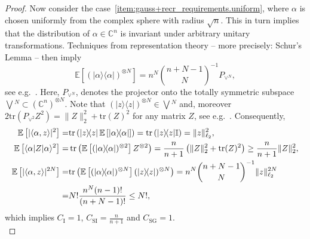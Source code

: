 \begin{proof}
  Now consider the case~\ref{item:gauss+recr_requirements.uniform}, where $\alpha$ is chosen uniformly from the complex sphere with radius $\sqrt{n}$.
  This in turn implies that the distribution of $\alpha \in \mathbb{C}^n$ is invariant under arbitrary unitary transformations.
  Techniques from representation theory -- more precisely: Schur's Lemma -- then imply
  \[
    \label{eq:pl.from_schur}
    \mathbb{E} \left[ (|\alpha \rangle \! \langle \alpha| )^{\otimes N} \right] =
    n^N \binom{n+N-1}{N}^{-1}  P_{\vee^N},
  \]
  see e.g.\ \cite[Lemma~1]{Scott_2006_Tight}.
  Here, $ P_{\vee^N}$, denotes the projector onto the totally symmetric subspace $\bigvee\!^N \subset \left( \mathbb{C}^n \right)^{\otimes N}$.
  Note that $\left(| z \rangle \! \langle  z| \right)^{\otimes N} \in \bigvee\!^N$ and, moreover $2 \mathrm{tr} \left(  P_{\vee^2}  Z^2 \right)= \|  Z \|_2^2 + \mathrm{tr} ( Z)^2$ for any matrix $ Z$, see e.g.\ \cite[Lemma~17]{Kueng_2016_Low}.
  Consequently,
  \begin{align}
    \mathbb{E} \left[ | \langle\alpha, z \rangle|^2 \right]
    =& \mathrm{tr} \left( | z \rangle \! \langle  z| \, \mathbb{E} \left[ |\alpha \rangle \! \langle\alpha| \right] \right)
    = \mathrm{tr} \left( | z \rangle \! \langle  z| \mathbb{I} \right) = \|  z \|_{\ell_2}^2, \\
    \mathbb{E} \left[
    \langle\alpha| Z |\alpha \rangle^2 \right]
    =& \operatorname{tr} \left( \mathbb{E} \left[ (|\alpha \rangle \! \langle\alpha|)^{\otimes 2} \right]  Z^{\otimes 2} \right)
    = \frac{n}{n+1} \left( \|  Z \|_2^2 + \mathrm{tr}( Z)^2 \right) \geq \frac{n}{n+1} \|  Z \|_2^2, \\
    \mathbb{E} \left[ | \langle\alpha,  z \rangle |^{2N} \right]
    =& \mathrm{tr} \left(\mathbb{E} \left[ (|\alpha \rangle \! \langle\alpha|)^{\otimes N} \right]  (| z\rangle \! \langle  z|)^{\otimes N}  \right)
    = n^N \binom{n+N-1}{N}^{-1} \|  z \|_{\ell_2}^{2N} \\
    =& N! \frac{n^N (n-1)!}{(n+N-1)!} \leq N!,
  \end{align}
  which implies $C_\mathrm{I}=1$, $C_\mathrm{SI} = \frac{n}{n+1}$ and $C_\mathrm{SG}=1$.\\




\end{proof}
